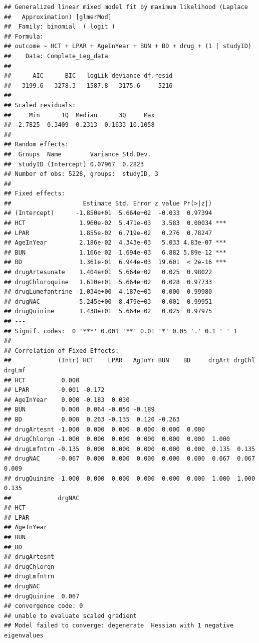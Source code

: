 \documentclass[]{article}
\begin{document}
\begin{verbatim}
## Generalized linear mixed model fit by maximum likelihood (Laplace
##   Approximation) [glmerMod]
##  Family: binomial  ( logit )
## Formula: 
## outcome ~ HCT + LPAR + AgeInYear + BUN + BD + drug + (1 | studyID)
##    Data: Complete_Leg_data
## 
##      AIC      BIC   logLik deviance df.resid 
##   3199.6   3278.3  -1587.8   3175.6     5216 
## 
## Scaled residuals: 
##     Min      1Q  Median      3Q     Max 
## -2.7825 -0.3409 -0.2313 -0.1633 10.1058 
## 
## Random effects:
##  Groups  Name        Variance Std.Dev.
##  studyID (Intercept) 0.07967  0.2823  
## Number of obs: 5228, groups:  studyID, 3
## 
## Fixed effects:
##                    Estimate Std. Error z value Pr(>|z|)    
## (Intercept)      -1.850e+01  5.664e+02  -0.033  0.97394    
## HCT               1.960e-02  5.471e-03   3.583  0.00034 ***
## LPAR              1.855e-02  6.719e-02   0.276  0.78247    
## AgeInYear         2.186e-02  4.343e-03   5.033 4.83e-07 ***
## BUN               1.166e-02  1.694e-03   6.882 5.89e-12 ***
## BD                1.361e-01  6.944e-03  19.601  < 2e-16 ***
## drugArtesunate    1.404e+01  5.664e+02   0.025  0.98022    
## drugChloroquine   1.610e+01  5.664e+02   0.028  0.97733    
## drugLumefantrine -1.034e+00  4.187e+03   0.000  0.99980    
## drugNAC          -5.245e+00  8.479e+03  -0.001  0.99951    
## drugQuinine       1.438e+01  5.664e+02   0.025  0.97975    
## ---
## Signif. codes:  0 '***' 0.001 '**' 0.01 '*' 0.05 '.' 0.1 ' ' 1
## 
## Correlation of Fixed Effects:
##             (Intr) HCT    LPAR   AgInYr BUN    BD     drgArt drgChl drgLmf
## HCT          0.000                                                        
## LPAR        -0.001 -0.172                                                 
## AgeInYear    0.000 -0.183  0.030                                          
## BUN          0.000  0.064 -0.050 -0.189                                   
## BD           0.000  0.263 -0.135  0.120 -0.263                            
## drugArtesnt -1.000  0.000  0.000  0.000  0.000  0.000                     
## drugChlorqn -1.000  0.000  0.000  0.000  0.000  0.000  1.000              
## drugLmfntrn -0.135  0.000  0.000  0.000  0.000  0.000  0.135  0.135       
## drugNAC     -0.067  0.000  0.000  0.000  0.000  0.000  0.067  0.067  0.009
## drugQuinine -1.000  0.000  0.000  0.000  0.000  0.000  1.000  1.000  0.135
##             drgNAC
## HCT               
## LPAR              
## AgeInYear         
## BUN               
## BD                
## drugArtesnt       
## drugChlorqn       
## drugLmfntrn       
## drugNAC           
## drugQuinine  0.067
## convergence code: 0
## unable to evaluate scaled gradient
## Model failed to converge: degenerate  Hessian with 1 negative eigenvalues
\end{verbatim}
\end{document}
